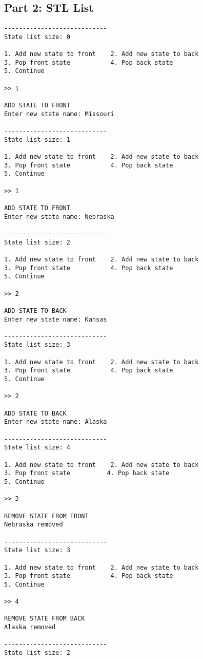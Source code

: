     \newpage
    \subsection{Part 2: STL List}

\begin{lstlisting}[style=output]
----------------------------
State list size: 0

1. Add new state to front	 2. Add new state to back
3. Pop front state		     4. Pop back state
5. Continue

>> 1

ADD STATE TO FRONT
Enter new state name: Missouri

----------------------------
State list size: 1

1. Add new state to front	 2. Add new state to back
3. Pop front state		     4. Pop back state
5. Continue

>> 1

ADD STATE TO FRONT
Enter new state name: Nebraska

----------------------------
State list size: 2

1. Add new state to front	 2. Add new state to back
3. Pop front state		     4. Pop back state
5. Continue

>> 2

ADD STATE TO BACK
Enter new state name: Kansas

----------------------------
State list size: 3

1. Add new state to front	 2. Add new state to back
3. Pop front state		     4. Pop back state
5. Continue

>> 2

ADD STATE TO BACK
Enter new state name: Alaska  

----------------------------
State list size: 4

1. Add new state to front	 2. Add new state to back
3. Pop front state		    4. Pop back state
5. Continue

>> 3

REMOVE STATE FROM FRONT
Nebraska removed

----------------------------
State list size: 3

1. Add new state to front	 2. Add new state to back
3. Pop front state		     4. Pop back state
5. Continue

>> 4

REMOVE STATE FROM BACK
Alaska removed

----------------------------
State list size: 2


\end{lstlisting}
